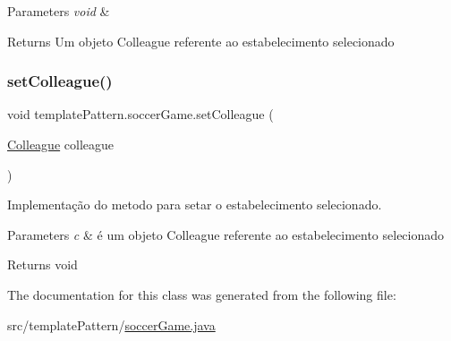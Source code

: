 \begin{DoxyParams}{Parameters}
{\em void} & \\
\hline
\end{DoxyParams}
\begin{DoxyReturn}{Returns}
Um objeto Colleague referente ao estabelecimento selecionado 
\end{DoxyReturn}
\mbox{\label{classtemplate_pattern_1_1soccer_game_a9fc248b70ca24460d572bc427ee19d3f}} 
\subsubsection{\texorpdfstring{setColleague()}{setColleague()}}
{\footnotesize\ttfamily void template\+Pattern.\+soccer\+Game.\+set\+Colleague (\begin{DoxyParamCaption}\item[{\mbox{\hyperlink{classmediator_pattern_1_1_colleague}{Colleague}}}]{colleague }\end{DoxyParamCaption})}



Implementação do metodo para setar o estabelecimento selecionado. 


\begin{DoxyParams}{Parameters}
{\em c} & é um objeto Colleague referente ao estabelecimento selecionado \\
\hline
\end{DoxyParams}
\begin{DoxyReturn}{Returns}
void 
\end{DoxyReturn}


The documentation for this class was generated from the following file\+:\begin{DoxyCompactItemize}
\item 
src/template\+Pattern/\mbox{\hyperlink{soccer_game_8java}{soccer\+Game.\+java}}\end{DoxyCompactItemize}
